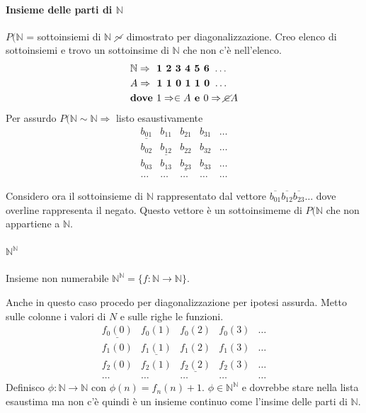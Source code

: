\documentclass{article}
\begin{document}
\paragraph{Insieme delle parti di $\mathbb{N}$}
$P(\mathbb{N}$ = {sottoinsiemi di $\mathbb{N}$} $\cancel{\sim}$ dimostrato per diagonalizzazione.
Creo elenco di sottoinsiemi e trovo un sottoinsime di $\mathbb{N}$ che non c'è nell'elenco.
\begin{displaymath}
	\begin{split}
		& \mathbb{N} \Rightarrow \textbf{ 1 2 3 4 5 6 } \dots \\
		& A          \Rightarrow \textbf{ 1 1 0 1 1 0 } \dots \\
		&\textbf{dove } 1 \Rightarrow \in A \textbf{ e } 0 \Rightarrow \cancel{\in} A
	\end{split}	
\end{displaymath}
Per assurdo $P(\mathbb{N} \sim \mathbb{N} \Rightarrow$ listo esaustivamente
\begin{displaymath}
\begin{matrix}
\underline{b_{01}} & b_{11} & b_{21} & b_{31} & \dots \\
{b_{02}} & \underline{b_{12}} & b_{22} & b_{32} & \dots \\
{b_{03}} & b_{13} & \underline{b_{23}} & b_{33} & \dots \\
\dots & \dots & \dots & \dots  & \dots
\end{matrix}
\end{displaymath}

Considero ora il sottoinsieme di $\mathbb{N}$ rappresentato dal vettore $\overline{b_{01}} \overline{b_{12}} \overline{b_{23}} \dots$ dove overline rappresenta il negato. Questo vettore è un sottoinsimeme di $P(\mathbb{N}$ che non appartiene a $\mathbb{N}$.

\paragraph{$\mathbb{N}^{\mathbb{N}}$}
Insieme non numerabile $\mathbb{N}^{\mathbb{N}} = \{ f:\mathbb{N}\rightarrow \mathbb{N} \}$.


\noindent
Anche in questo caso procedo per diagonalizzazione per ipotesi assurda. Metto sulle colonne i valori di $N$ e sulle righe le funzioni.
\begin{displaymath}
\begin{matrix}
\underline{f_0(0)} & f_0(1) & f_0(2) & f_0(3) & \dots \\
f_1(0) & \underline{f_1(1)} & f_1(2) & f_1(3) & \dots \\
f_2(0) & f_2(1) & \underline{f_2(2)} & f_2(3) & \dots \\
\dots & \dots & \dots & \dots  & \dots
\end{matrix}
\end{displaymath}
Definisco $\phi: \mathbb{N} \rightarrow \mathbb{N}$ con $\phi(n)=f_n(n)+1$. $\phi \in \mathbb{N}^{\mathbb{N}}$ e dovrebbe stare nella lista esaustima ma non c'è quindi è un insieme continuo come l'insime delle parti di $\mathbb{N}$.
\end{document}
